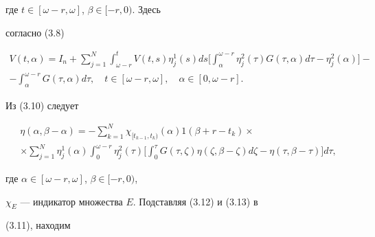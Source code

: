 где $t \in[\omega-r, \omega]$, $\beta \in[-r,0)$. Здесь


согласно (3.8)


\begin{multline}


V(t, \alpha) =I_{n}+ \sum_{j=1}^{N}


\int_{\omega-r}^{t} V(t,s) \eta_{j}^{1}(s) ds


\bigg [\int_{\alpha}^{\omega -r} \eta_{j}^{2}(\tau) G(\tau, \alpha) d \tau


 - \eta_{j}^{2}(\alpha) \bigg]- \\


-\int_{\alpha}^{\omega-r} G(\tau, \alpha) d \tau, \quad t


\in[\omega-r, \omega], \quad \alpha \in[0, \omega-r].


\end{multline}





Из (3.10) следует


\begin{multline}


\eta(\alpha, \beta- \alpha) =


-\sum_{k=1}^{N} \chi_{[t_{k-1},t_{k}) }(\alpha)


1(\beta+r-t_{k}) \times  \\


%


\times \sum_{j=1}^{N} \eta_{j}^{1}(\alpha) \int_{0}^{\omega-r}


\eta_{j}^{2}(\tau)


\bigg[\int_{0}^{\tau} G(\tau, \zeta) \eta(\zeta, \beta- \zeta)


d \zeta - \eta(\tau, \beta- \tau)\bigg] d \tau,


\end{multline}


где $ \alpha \in[\omega -r, \omega]$, $\beta \in[-r,0)$,


$\chi_{E}$ --- индикатор множества $E$. Подставляя (3.12) и (3.13) в


(3.11), находим


